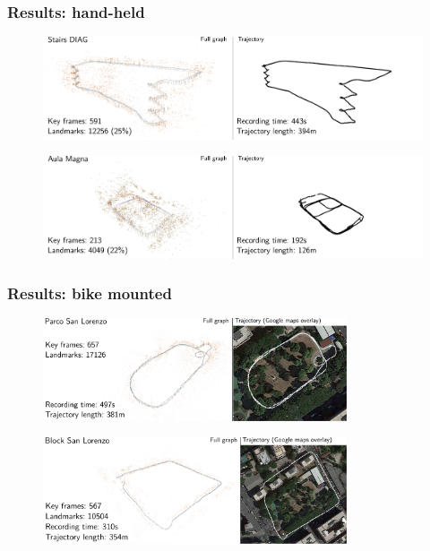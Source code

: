 \documentclass[11pt]{beamer}
\begin{document}
\begin{frame}
\frametitle{Results: hand-held}
\begin{figure}[!htb]
\centering
\includegraphics[width=\textwidth]{figures/results/stairs_combined.pdf}
\end{figure}
\begin{figure}[!htb]
\centering
\includegraphics[width=\textwidth]{figures/results/aula_magna.pdf}
\end{figure}
\end{frame}

\begin{frame}
\frametitle{Results: bike mounted}
\begin{figure}[!htb]
\centering
\includegraphics[width=0.8\textwidth]{figures/results/san_lorenzo_parco.pdf}
\end{figure}
\begin{figure}[!htb]
\centering
\includegraphics[width=0.8\textwidth]{figures/results/san_lorenzo_street.pdf}
\end{figure}
\end{frame}
\end{document}
